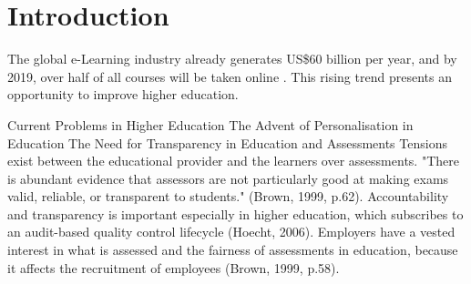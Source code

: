 
\chapter{Introduction}  %



The global e-Learning industry already generates US\$60 billion per year, and by 2019, over half of all courses will be taken 
online \citep[p.17]{panto2013challenge}. This rising trend presents an opportunity to improve higher education.

Current Problems in Higher Education
The Advent of Personalisation in Education
The Need for Transparency in Education and Assessments
Tensions exist between the educational provider and the learners over assessments. "There is abundant evidence that assessors are not particularly good at making exams valid, reliable, or transparent to students." (Brown, 1999, p.62).
Accountability and transparency is important especially in higher education, which subscribes to an audit-based quality control lifecycle (Hoecht, 2006).
Employers have a vested interest in what is assessed and the fairness of assessments in education, because it affects the recruitment of employees (Brown, 1999, p.58).


